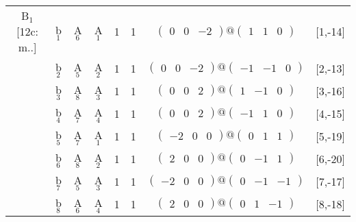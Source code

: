 \documentclass[fleqn,10pt,landscape]{article}
\begin{document}
\begin{itemize}
\begin{center}
\begin{longtable}{cc|cc|c|c|c|l}
B$_{1}$ [12c: m..] & b$_{1}$ & A$_{6}$ & A$_{1}$ & 1 & 1 & $\begin{pmatrix} 0 & 0 & -2 \end{pmatrix}@\begin{pmatrix} 1 & 1 & 0 \end{pmatrix}$ & [1,-14] \\
& b$_{2}$ & A$_{5}$ & A$_{2}$ & 1 & 1 & $\begin{pmatrix} 0 & 0 & -2 \end{pmatrix}@\begin{pmatrix} -1 & -1 & 0 \end{pmatrix}$ & [2,-13] \\
& b$_{3}$ & A$_{8}$ & A$_{3}$ & 1 & 1 & $\begin{pmatrix} 0 & 0 & 2 \end{pmatrix}@\begin{pmatrix} 1 & -1 & 0 \end{pmatrix}$ & [3,-16] \\
& b$_{4}$ & A$_{7}$ & A$_{4}$ & 1 & 1 & $\begin{pmatrix} 0 & 0 & 2 \end{pmatrix}@\begin{pmatrix} -1 & 1 & 0 \end{pmatrix}$ & [4,-15] \\
& b$_{5}$ & A$_{7}$ & A$_{1}$ & 1 & 1 & $\begin{pmatrix} -2 & 0 & 0 \end{pmatrix}@\begin{pmatrix} 0 & 1 & 1 \end{pmatrix}$ & [5,-19] \\
& b$_{6}$ & A$_{8}$ & A$_{2}$ & 1 & 1 & $\begin{pmatrix} 2 & 0 & 0 \end{pmatrix}@\begin{pmatrix} 0 & -1 & 1 \end{pmatrix}$ & [6,-20] \\
& b$_{7}$ & A$_{5}$ & A$_{3}$ & 1 & 1 & $\begin{pmatrix} -2 & 0 & 0 \end{pmatrix}@\begin{pmatrix} 0 & -1 & -1 \end{pmatrix}$ & [7,-17] \\
& b$_{8}$ & A$_{6}$ & A$_{4}$ & 1 & 1 & $\begin{pmatrix} 2 & 0 & 0 \end{pmatrix}@\begin{pmatrix} 0 & 1 & -1 \end{pmatrix}$ & [8,-18] \\

\end{longtable}
\end{center}
\end{itemize}
\end{document}
